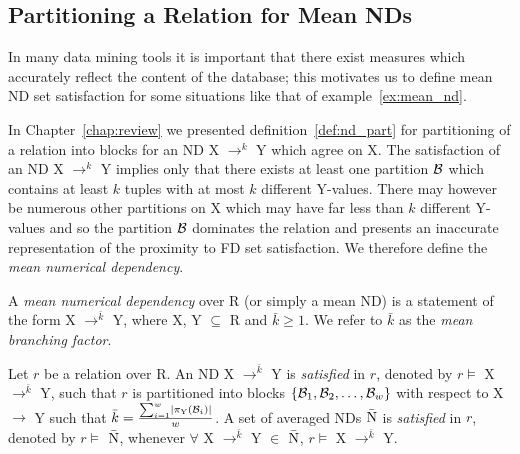 \subsection{Partitioning a Relation for Mean NDs}\label{nd:subsec:mean}
In many data mining tools it is important that there exist measures
which accurately reflect the content of the database; this motivates
us to define mean ND set satisfaction for some situations like that of
example~\ref{ex:mean_nd}.

\smallskip

In Chapter~\ref{chap:review} we presented definition~\ref{def:nd_part}
for partitioning of a relation into blocks for an ND X $\to^k$ Y which
agree on X.
The satisfaction of an ND X $\to^k$ Y implies only that there exists
at least one partition ${\cal B}$ which contains at least $k$ tuples
with at most $k$ different Y-values.  There may however be numerous
other partitions on X which may have far less than $k$ different
Y-values and so the partition ${\cal B}$ dominates the relation and
presents an inaccurate representation of the proximity to FD set
satisfaction.  We therefore define the {\em mean numerical dependency}.

\begin{definition}
\begin{rm}
A {\em mean numerical dependency} over R (or simply a mean ND)
is a statement of the form X $\to^{\bar{k}}$ Y, where X, Y $\subseteq$ R and
$\bar{k} \ge 1$. We refer to $\bar{k}$ as the {\em mean branching factor}.
\end{rm}
\end{definition}
\begin{definition}\label{def:sat-mean_nd}
\begin{rm}
Let $r$ be a relation over R.
An ND X $\to^{\bar{k}}$ Y is {\em satisfied} in $r$,
denoted by $r \models$ X $\to^{\bar{k}}$ Y, such that $r$ is
partitioned into blocks 
$\{{\cal B}_1, {\cal B}_2, \ldots, {\cal B}_w\}$ with respect to X
$\to$ Y such that $\bar{k} = \frac{\sum_{i = 1}^{w} \mid
\pi_{\rm Y}({\cal B}_{i}) \mid }{w}$.
A set of averaged NDs $\bar{\rm N}$ is {\em satisfied} in $r$,
denoted by $r \models$ $\bar{\rm N}$, whenever
$\forall$ X $\to^{\bar{k}}$ Y $\in$ $\bar{\rm N}$, $r \models$ X $\to^{\bar{k}}$ Y.
\end{rm}
\end{definition}



